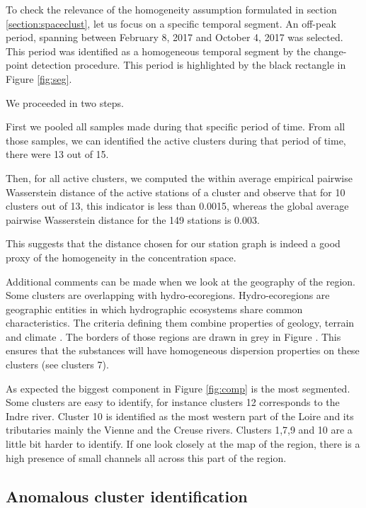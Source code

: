 To check the relevance of the homogeneity assumption formulated in section \ref{section:spaceclust}, let us focus on a specific temporal segment. An off-peak period, spanning between February 8, 2017 and October 4, 2017 was selected. This period was identified as a homogeneous temporal segment by the change-point detection procedure.  This period is highlighted by the black rectangle in Figure \ref{fig:seg}. 

We proceeded in two steps. 

First we pooled all samples made during that specific period of time. From all those samples, we can identified the active clusters during that period of time, there were 13 out of 15. 

Then, for all active clusters, we computed the within average empirical pairwise Wasserstein distance of the active stations of a cluster and observe that for 10 clusters out of 13, this indicator is less than 0.0015, whereas the global average pairwise Wasserstein distance for the 149 stations is 0.003. 

This suggests that the distance chosen for our station graph is indeed a good proxy of the homogeneity in the concentration space. 

Additional comments can be made when we look at the geography of the region. Some clusters are overlapping with hydro-ecoregions. Hydro-ecoregions are geographic entities in which hydrographic ecosystems share common characteristics. The criteria defining them combine properties of geology, terrain and climate \cite{wasson:hal-02580774}. The borders of those regions are drawn in grey in Figure . This ensures that the substances will have homogeneous dispersion properties on these clusters (see clusters 7).

As expected the biggest component in Figure \ref{fig:comp} is the most segmented. Some clusters are easy to identify, for instance clusters 12 corresponds to the Indre river. Cluster 10 is identified as the most western part of the Loire and its tributaries mainly the Vienne and the Creuse rivers. Clusters 1,7,9 and 10 are a little bit harder to identify. If one look closely at the map of the region, there is a high presence of small channels all across this part of the region. 


\subsection{Anomalous cluster identification}\label{subsection:anomalous}

